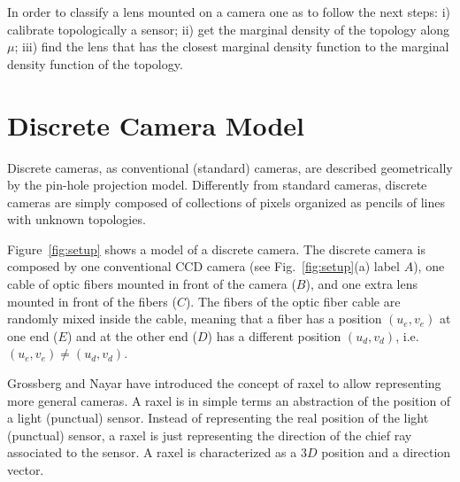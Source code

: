 In order to classify a lens mounted on a camera one as to follow the next steps: i)  calibrate topologically a sensor; ii) get the marginal density of the topology along $\mu$; iii) find the lens that has the closest marginal density function to  the marginal density function of the topology. 



\section{Discrete Camera Model}





%
%
%
Discrete cameras, as conventional (standard) cameras, are described geometrically by the pin-hole projection model. Differently from standard cameras, discrete cameras are simply composed of collections of pixels organized as pencils of lines with unknown topologies.
%


Figure~\ref{fig:setup} shows a model of a discrete camera.
%
The discrete camera is composed by
%
one conventional CCD camera (see Fig.~\ref{fig:setup}(a) label $A$),
%
one cable of optic fibers mounted in front of the camera ($B$),
%
and one extra lens mounted in front of the fibers ($C$).
% 
The fibers of the optic fiber cable are randomly mixed inside the cable, meaning that a fiber has a position $(u_e,v_e)$ at one end ($E$) and at the other end ($D$) has a different position $(u_d,v_d)$, i.e. $(u_e,v_e)\neq (u_d,v_d)$. 


Grossberg and Nayar\cite{Raxels} have introduced the concept of raxel to allow representing more general cameras. A raxel is in simple terms an abstraction of the position of a light (punctual) sensor. Instead of representing the real position of the light (punctual) sensor, a raxel is just representing the direction of the chief ray associated to the sensor. A raxel is characterized as a $3D$ position and a direction vector. %


